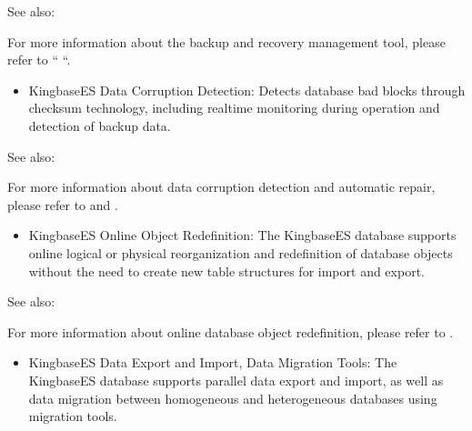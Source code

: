 \documentclass[letterpaper,10pt,english]{sphinxmanual}
\begin{document}
\begin{sphinxseealso}{See also:}

\sphinxAtStartPar
For more information about the backup and recovery management tool, please refer to “  “.


\end{sphinxseealso}

\begin{itemize}
\item {} 
\sphinxAtStartPar
KingbaseES Data Corruption Detection:
Detects database bad blocks through checksum technology, including real\sphinxhyphen{}time monitoring during operation and detection of backup data.

\end{itemize}


\begin{sphinxseealso}{See also:}

\sphinxAtStartPar
For more information about data corruption detection and automatic repair, please refer to  and .


\end{sphinxseealso}

\begin{itemize}
\item {} 
\sphinxAtStartPar
KingbaseES Online Object Redefinition:
The KingbaseES database supports online logical or physical reorganization and redefinition of database objects without the need to create new table structures for import and export.

\end{itemize}


\begin{sphinxseealso}{See also:}

\sphinxAtStartPar
For more information about online database object redefinition, please refer to .


\end{sphinxseealso}

\begin{itemize}
\item {} 
\sphinxAtStartPar
KingbaseES Data Export and Import, Data Migration Tools:
The KingbaseES database supports parallel data export and import, as well as data migration between homogeneous and heterogeneous databases using migration tools.

\end{itemize}
\end{document}
